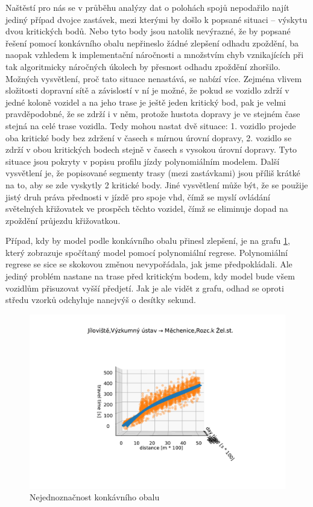 \bigbreak


Naštěstí pro nás se v průběhu analýzy dat o polohách spojů nepodařilo najít jediný případ dvojce zastávek, mezi kterými by došlo k popsané situaci -- výskytu dvou kritických bodů. Nebo tyto body jsou natolik nevýrazné, že by popsané řešení pomocí konkávního obalu nepřineslo žádné zlepšení odhadu zpoždění, ba naopak vzhledem k implementační náročnosti a množstvím chyb vznikajících při tak algoritmicky náročných úkolech by přesnost odhadu zpoždění zhoršilo. Možných vysvětlení, proč tato situace nenastává, se nabízí více. Zejména vlivem složitosti dopravní sítě a závislostí v ní je možné, že pokud se vozidlo zdrží v jedné koloně vozidel a na jeho trase je ještě jeden kritický bod, pak je velmi pravděpodobné, že se zdrží i v něm, protože hustota dopravy je ve stejném čase stejná na celé trase vozidla. Tedy mohou nastat dvě situace: 1. vozidlo projede oba kritické body bez zdržení v časech s mírnou úrovní dopravy, 2. vozidlo se zdrží v obou kritických bodech stejně v časech s vysokou úrovní dopravy. Tyto situace jsou pokryty v popisu profilu jízdy polynomiálním modelem. Další vysvětlení je, že popisované segmenty trasy (mezi zastávkami) jsou příliš krátké na to, aby se zde vyskytly 2 kritické body. Jiné vysvětlení může být, že se použije jistý druh práva přednosti v jízdě pro spoje \gls{vhd}, čímž se myslí ovládání světelných křižovatek ve prospěch těchto vozidel, čímž se eliminuje dopad na zpoždění průjezdu křižovatkou.


\bigbreak


Případ, kdy by model podle konkávního obalu přinesl zlepšení, je na grafu \ref{fig:good_to_concave_hull}, který zobrazuje spočítaný model pomocí polynomiální regrese. Polynomiální regrese se sice se skokovou změnou nevypořádala, jak jsme předpokládali. Ale jediný problém nastane na trase před kritickým bodem, kdy model bude všem vozidlům přisuzovat vyšší předjetí. Jak je ale vidět z grafu, odhad se oproti středu vzorků odchyluje nanejvýš o desítky sekund.


\begin{figure}
\centering
  \includegraphics[width=1\linewidth]{../img/good_to_concave_hull}
  \caption{Nejednoznačnost konkávního obalu}
  \label{fig:good_to_concave_hull}
\end{figure}


